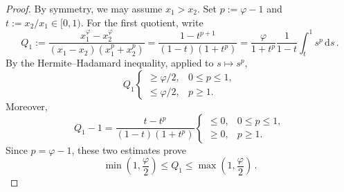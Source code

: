 \documentclass{article}
\newcommand{\lb}{\left(} %
\newcommand{\rb}{\right)} %
\newcommand{\br}[1]{\lb #1 \rb} %
\newcommand{\brOf}[1]{\!\br{#1}} %
\newcommand{\eqfs}{\,.}
\begin{document}
%
\begin{proof}
    By symmetry, we may assume $x_1>x_2$. Set
    $p:=\varphi-1$ and $t:=x_2/x_1\in[0,1)$.     
    For the first quotient, write
    \begin{equation}
        Q_1
        :=
        \frac{x_1^\varphi-x_2^\varphi}
        {(x_1-x_2)(x_1^p+x_2^p)}
        =
        \frac{1-t^{p+1}}{(1-t)(1+t^p)}
        =
        \frac{\varphi}{1+t^p}
        \frac{1}{1-t}\int_t^1 s^p\,\mathrm{d}s
        \eqfs
    \end{equation}
    By the Hermite--Hadamard inequality, applied to $s\mapsto s^p$,
    \begin{equation}
        Q_1
        \begin{cases}
            \geq \varphi/2, & 0\leq p\leq1,\\
            \leq \varphi/2, & p\geq1.
        \end{cases}
    \end{equation}
    Moreover,
    \begin{equation}
        Q_1-1
        =
        \frac{t-t^p}{(1-t)(1+t^p)}
        \begin{cases}
            \leq0, & 0\leq p\leq1,\\
            \geq0, & p\geq1.
        \end{cases}
    \end{equation}
    Since $p=\varphi-1$, these two estimates prove
    \begin{equation}
        \min\brOf{1,\frac{\varphi}{2}}
        \leq Q_1\leq
        \max\brOf{1,\frac{\varphi}{2}}
        \eqfs
    \end{equation}
    

\end{proof}
\end{document}
